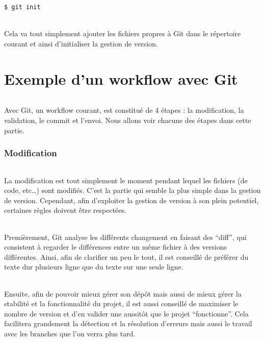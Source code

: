 \documentclass[french, a4paper, 12pt, titlepage]{article}
\begin{document}
\begin{lstlisting}
$ git init
\end{lstlisting}

\paragraph{} Cela va tout simplement ajouter les fichiers propres à Git dans le
répertoire courant et ainsi d'initialiser la gestion de version.

\part{Exemple d'un workflow avec Git}

\paragraph{} Avec Git, un workflow courant, est constitué de 4 étapes : la
modification, la validation, le commit et l'envoi. Nous allons voir chacune des
étapes dans cette partie.

\section{Modification}

\paragraph{} La modification est tout simplement le moment pendant lequel les
fichiers (de code, etc\dots) sont modifiés. C'est la partie qui semble la plus
simple dans la gestion de version. Cependant, afin d'exploiter la gestion de
version à son plein potentiel, certaines règles doivent être respectées.

\paragraph{} Premièrement, Git analyse les différents changement en faisant des
``diff'', qui consistent à regarder le différences entre un même fichier à des
versions différentes. Ainsi, afin de clarifier un peu le tout, il est conseillé
de préférer du texte dur plusieurs ligne que du texte sur une seule ligne.

\paragraph{} Ensuite, afin de pouvoir mieux gérer son dépôt mais aussi de mieux
gérer la stabilité et la fonctionnalité du projet, il est aussi conseillé de
maximiser le nombre de version et d'en valider une aussitôt que le projet
``fonctionne''. Cela facilitera grandement la détection et la résolution
d'erreurs mais aussi le travail avec les branches que l'on verra plus tard.

%
%
\end{document}
